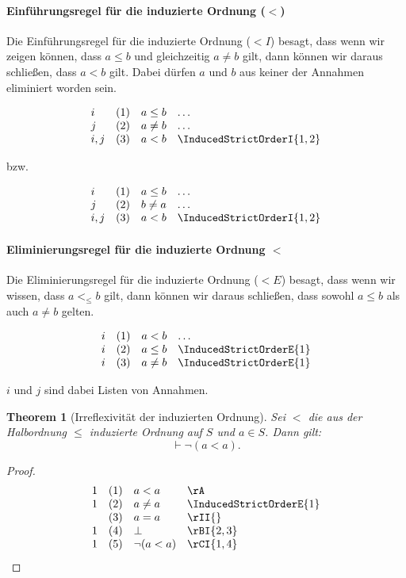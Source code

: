 \documentclass{book}
\theoremstyle{plain}
\newtheorem{theorem}{Theorem}
\theoremstyle{remark}
\theoremstyle{definition}
\begin{document}
\paragraph{Einführungsregel für die induzierte Ordnung (\(<\))}
Die Einführungsregel für die induzierte Ordnung (\(< I\)) besagt, dass wenn wir zeigen können, dass \(a \leq b\) und gleichzeitig \(a \neq b\) gilt, dann können wir daraus schließen, dass \(a < b\) gilt. Dabei dürfen \(a\) und \(b\) aus keiner der Annahmen eliminiert worden sein.

\[
\begin{array}{llll}
    i   & (1) & a \leq b & \dots \\
    j   & (2) & a \neq b & \dots \\
    i,j & (3) & a < b & \InducedStrictOrderI{1,2}
\end{array}
\]

bzw.

\[
\begin{array}{llll}
    i   & (1) & a \leq b & \dots \\
    j   & (2) & b \neq a & \dots \\
    i,j & (3) & a < b & \InducedStrictOrderI{1,2}
\end{array}
\]

\paragraph{Eliminierungsregel für die induzierte Ordnung \(<\)}
Die Eliminierungsregel für die induzierte Ordnung (\(< E\)) besagt, dass wenn wir wissen, dass \(a <_{\leq} b\) gilt, dann können wir daraus schließen, dass sowohl \(a \leq b\) als auch \(a \neq b\) gelten.

\[
\begin{array}{llll}
    i & (1) & a < b & \dots \\
    i & (2) & a \leq b & \InducedStrictOrderE{1} \\
    i & (3) & a \neq b & \InducedStrictOrderE{1}
\end{array}
\]

\(i\) und \(j\) sind dabei Listen von Annahmen.

\label{InducedStrictOrderImpnLpaLneqaRp}
\begin{theorem}[Irreflexivität der induzierten Ordnung]
    Sei \(<\) die aus der Halbordnung \(\leq\) induzierte Ordnung auf \(S\) und \(a\in S\). Dann gilt:
    \[
    \vdash \neg (a < a).
    \]
\end{theorem}
\begin{proof}
	\[
	\begin{array}{llll}
		1   & (1) & a<a & \rA\\
		1   & (2) & a\neq a & \InducedStrictOrderE{1}\\
		  & (3) & a=a & \rII{}\\
        1   & (4) & \bot & \rBI{2,3}\\
        1   & (5) & \neg(a<a) & \rCI{1,4}\\
	\end{array}
	\]    
\end{proof}
\end{document}
